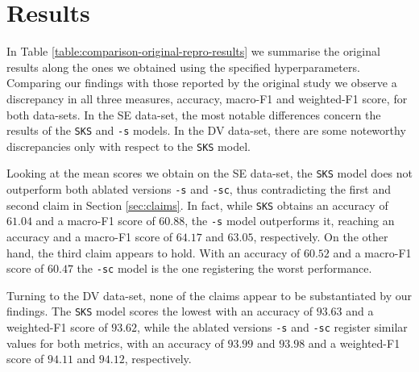 \section{Results}
\label{sec:results}

In Table \ref{table:comparison-original-repro-results} we summarise the original results along the ones we obtained using the specified hyperparameters. Comparing our findings with those reported by the original study we observe a discrepancy in all three measures, accuracy, macro-F1 and weighted-F1 score, for both data-sets. In the SE data-set, the most notable differences concern the results of the \texttt{SKS} and \texttt{-s} models. In the DV data-set, there are some noteworthy discrepancies only with respect to the \texttt{SKS} model.

Looking at the mean scores we obtain on the SE data-set, the \texttt{SKS} model does not outperform both ablated versions \texttt{-s} and \texttt{-sc}, thus contradicting the first and second claim in Section \ref{sec:claims}. In fact, while \texttt{SKS} obtains an accuracy of $61.04$ and a macro-F1 score of $60.88$, the \texttt{-s} model outperforms it, reaching an accuracy and a macro-F1 score of $64.17$ and $63.05$, respectively. On the other hand, the third claim appears to hold. With an accuracy of $60.52$ and a macro-F1 score of $60.47$ the \texttt{-sc} model is the one registering the worst performance.

Turning to the DV data-set, none of the claims appear to be substantiated by our findings. The \texttt{SKS} model scores the lowest with an accuracy of $93.63$ and a weighted-F1 score of $93.62$, while the ablated versions \texttt{-s} and \texttt{-sc} register similar values for both metrics, with an accuracy of $93.99$ and $93.98$ and a weighted-F1 score of $94.11$ and $94.12$, respectively.

